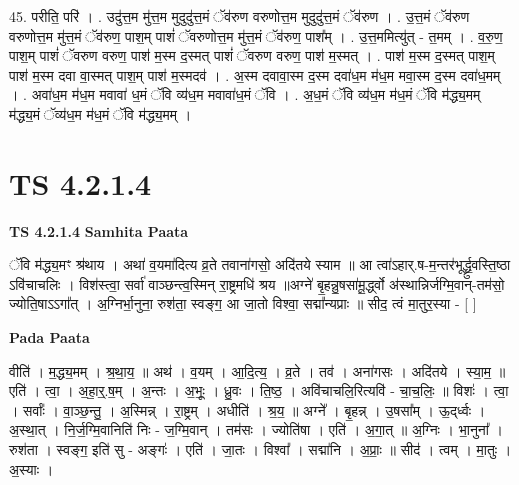 \documentclass[17pt]{extarticle}
\begin{document}
45. परीति॒ परि॑ । . उदु॑त्त॒म मु॑त्त॒म मुदुदु॑त्त॒मं ॅव॑रुण वरुणोत्त॒म मुदुदु॑त्त॒मं ॅव॑रुण । . उ॒त्त॒मं ॅव॑रुण वरुणोत्त॒म मु॑त्त॒मं ॅव॑रुण॒ पाश॒म् पाशं॑ ॅवरुणोत्त॒म मु॑त्त॒मं ॅव॑रुण॒ पाश᳚म् । . उ॒त्त॒ममित्यु॑त् - त॒मम् । . व॒रु॒ण॒ पाश॒म् पाशं॑ ॅवरुण वरुण॒ पाश॑ म॒स्म द॒स्मत् पाशं॑ ॅवरुण वरुण॒ पाश॑ म॒स्मत् । . पाश॑ म॒स्म द॒स्मत् पाश॒म् पाश॑ म॒स्म दवा वा॒स्मत् पाश॒म् पाश॑ म॒स्मदव॑ । . अ॒स्म दवावा॒स्म द॒स्म दवा॑ध॒म म॑ध॒म मवा॒स्म द॒स्म दवा॑ध॒मम् । . अवा॑ध॒म म॑ध॒म मवावा॑ ध॒मं ॅवि व्य॑ध॒म मवावा॑ध॒मं ॅवि । . अ॒ध॒मं ॅवि व्य॑ध॒म म॑ध॒मं ॅवि म॑द्ध्य॒मम् म॑द्ध्य॒मं ॅव्य॑ध॒म म॑ध॒मं ॅवि म॑द्ध्य॒मम् । \newline
\pagebreak
{}

\section{ TS 4.2.1.4 }

\textbf{TS 4.2.1.4 } \newline
\textbf{Samhita Paata} \newline

ॅवि म॑द्ध्य॒मꣳ श्र॑थाय । अथा॑ व॒यमा॑दित्य व्र॒ते तवाना॑गसो॒ अदि॑तये स्याम ॥ आ त्वा॑ऽहार्.ष-म॒न्तर॑भूर्द्ध्रु॒वस्ति॒ष्ठा ऽवि॑चाचलिः । विश॑स्त्वा॒ सर्वा॑ वाञ्छन्त्व॒स्मिन् रा॒ष्ट्रमधि॑ श्रय ॥अग्ने॑ बृ॒हन्नु॒षसा॑मू॒र्द्ध्वो अ॑स्थान्निर्जग्मि॒वान्-तम॑सो॒ ज्योति॒षाऽऽगा᳚त् । अ॒ग्निर्भा॒नुना॒ रुश॑ता॒ स्वङ्ग॒ आ जा॒तो विश्वा॒ सद्मा᳚न्यप्राः ॥ सीद॒ त्वं मा॒तुर॒स्या - [  ] \newline

\textbf{Pada Paata} \newline

वीति॑ । म॒द्ध्य॒मम् । श्र॒था॒य॒ ॥ अथ॑ । व॒यम् । आ॒दि॒त्य॒ । व्र॒ते । तव॑ । अना॑गसः । अदि॑तये । स्या॒म॒ ॥ एति॑ । त्वा॒ । अ॒हा॒र्॒.ष॒म् । अ॒न्तः । अ॒भूः॒ । ध्रु॒वः । ति॒ष्ठ॒ । अवि॑चाचलि॒रित्यवि॑ - चा॒च॒लिः॒ ॥ विशः॑ । त्वा॒ । सर्वाः᳚ । वा॒ञ्छ॒न्तु॒ । अ॒स्मिन्न् । रा॒ष्ट्रम् । अधीति॑ । श्र॒य॒ ॥ अग्ने᳚ । बृ॒हन्न् । उ॒षसा᳚म् । ऊ॒द्‌र्ध्वः । अ॒स्था॒त् । नि॒र्ज॒ग्मि॒वानिति॑ निः - ज॒ग्मि॒वान् । तम॑सः । ज्योति॑षा । एति॑ । अ॒गा॒त् ॥ अ॒ग्निः । भा॒नुना᳚ । रुश॑ता । स्वङ्ग॒ इति॑ सु - अङ्गः॑ । एति॑ । जा॒तः । विश्वा᳚ । सद्मा॑नि । अ॒प्राः॒ ॥ सीद॑ । त्वम् । मा॒तुः । अ॒स्याः ।  \newline
\end{document}
